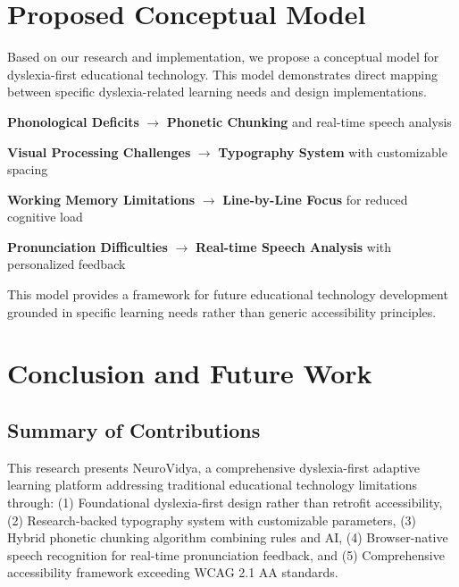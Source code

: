 \documentclass[journal]{IEEEtran}
\begin{document}
\section{Proposed Conceptual Model}

Based on our research and implementation, we propose a conceptual model for dyslexia-first educational technology. This model demonstrates direct mapping between specific dyslexia-related learning needs and design implementations.

\textbf{Phonological Deficits} $\rightarrow$ \textbf{Phonetic Chunking} and real-time speech analysis

\textbf{Visual Processing Challenges} $\rightarrow$ \textbf{Typography System} with customizable spacing

\textbf{Working Memory Limitations} $\rightarrow$ \textbf{Line-by-Line Focus} for reduced cognitive load

\textbf{Pronunciation Difficulties} $\rightarrow$ \textbf{Real-time Speech Analysis} with personalized feedback

This model provides a framework for future educational technology development grounded in specific learning needs rather than generic accessibility principles.

\section{Conclusion and Future Work}

\subsection{Summary of Contributions}

This research presents NeuroVidya, a comprehensive dyslexia-first adaptive learning platform addressing traditional educational technology limitations through: (1) Foundational dyslexia-first design rather than retrofit accessibility, (2) Research-backed typography system with customizable parameters, (3) Hybrid phonetic chunking algorithm combining rules and AI, (4) Browser-native speech recognition for real-time pronunciation feedback, and (5) Comprehensive accessibility framework exceeding WCAG 2.1 AA standards.
\end{document}
